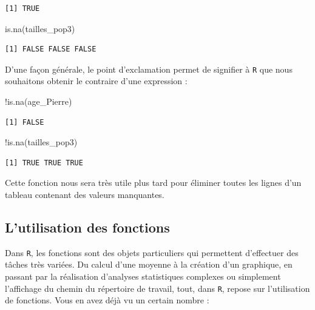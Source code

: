 \documentclass[
  a4paper,
  DIV=11,
  numbers=noendperiod,
  oneside]{scrreprt}
\newenvironment{Shaded}{}{}
\newcommand{\FunctionTok}[1]{\textcolor[rgb]{0.44,0.26,0.76}{#1}}
\newcommand{\NormalTok}[1]{\textcolor[rgb]{0.14,0.16,0.18}{#1}}
\newcommand{\SpecialCharTok}[1]{\textcolor[rgb]{0.00,0.36,0.77}{#1}}
\begin{document}
\begin{verbatim}
[1] TRUE
\end{verbatim}

\begin{Shaded}
\begin{Highlighting}[]
\FunctionTok{is.na}\NormalTok{(tailles\_pop3)}
\end{Highlighting}
\end{Shaded}

\begin{verbatim}
[1] FALSE FALSE FALSE
\end{verbatim}

D'une façon générale, le point d'exclamation permet de signifier à
\texttt{R} que nous souhaitons obtenir le contraire d'une expression :

\begin{Shaded}
\begin{Highlighting}[]
\SpecialCharTok{!}\FunctionTok{is.na}\NormalTok{(age\_Pierre)}
\end{Highlighting}
\end{Shaded}

\begin{verbatim}
[1] FALSE
\end{verbatim}

\begin{Shaded}
\begin{Highlighting}[]
\SpecialCharTok{!}\FunctionTok{is.na}\NormalTok{(tailles\_pop3)}
\end{Highlighting}
\end{Shaded}

\begin{verbatim}
[1] TRUE TRUE TRUE
\end{verbatim}

Cette fonction nous sera très utile plus tard pour éliminer toutes les
lignes d'un tableau contenant des valeurs manquantes.

\subsection{L'utilisation des fonctions}\label{sec-functions}

Dans \texttt{R}, les fonctions sont des objets particuliers qui
permettent d'effectuer des tâches très variées. Du calcul d'une moyenne
à la création d'un graphique, en passant par la réalisation d'analyses
statistiques complexes ou simplement l'affichage du chemin du répertoire
de travail, tout, dans \texttt{R}, repose sur l'utilisation de
fonctions. Vous en avez déjà vu un certain nombre :
\end{document}
